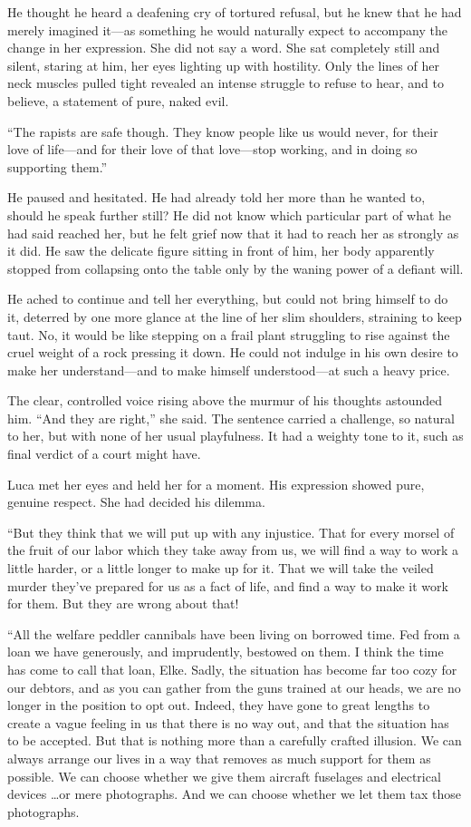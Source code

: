 He thought he heard a deafening cry of tortured refusal, but he knew that he had merely imagined it---as something he would naturally expect to accompany the change in her expression. She did not say a word. She sat completely still and silent, staring at him, her eyes lighting up with hostility. Only the lines of her neck muscles pulled tight revealed an intense struggle to refuse to hear, and to believe, a statement of pure, naked evil.

``The rapists are safe though. They know people like us would never, for their love of life---and for their love of that love---stop working, and in doing so supporting them.''

He paused and hesitated. He had already told her more than he wanted to, should he speak further still? He did not know which particular part of what he had said reached her, but he felt grief now that it had to reach her as strongly as it did. He saw the delicate figure sitting in front of him, her body apparently stopped from collapsing onto the table only by the waning power of a defiant will.

He ached to continue and tell her everything, but could not bring himself to do it, deterred by one more glance at the line of her slim shoulders, straining to keep taut. No, it would be like stepping on a frail plant struggling to rise against the cruel weight of a rock pressing it down. He could not indulge in his own desire to make her understand---and to make himself understood---at such a heavy price.

The clear, controlled voice rising above the murmur of his thoughts astounded him. ``And they are right,'' she said. The sentence carried a challenge, so natural to her, but with none of her usual playfulness. It had a weighty tone to it, such as final verdict of a court might have.

Luca met her eyes and held her for a moment. His expression showed pure, genuine respect. She had decided his dilemma.

``But they think that we will put up with any injustice. That for every morsel of the fruit of our labor which they take away from us, we will find a way to work a little harder, or a little longer to make up for it. That we will take the veiled murder they've prepared for us as a fact of life, and find a way to make it work for them. But they are wrong about that!

``All the welfare peddler cannibals have been living on borrowed time. Fed from a loan we have generously, and imprudently, bestowed on them. I think the time has come to call that loan, Elke. Sadly, the situation has become far too cozy for our debtors, and as you can gather from the guns trained at our heads, we are no longer in the position to opt out. Indeed, they have gone to great lengths to create a vague feeling in us that there is no way out, and that the situation has to be accepted. But that is nothing more than a carefully crafted illusion. We can always arrange our lives in a way that removes as much support for them as possible. We can choose whether we give them aircraft fuselages and electrical devices \ldots or mere photographs. And we can choose whether we let them tax those photographs.

